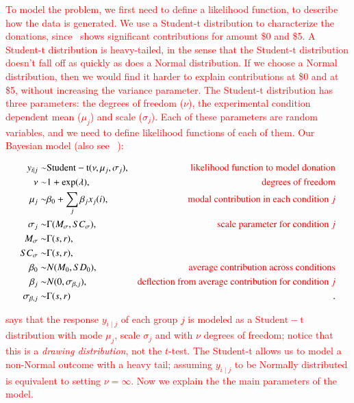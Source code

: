 \textcolor{red}{To model the problem, we first need to define a likelihood function, to describe how the data is generated. We use a Student-t distribution to characterize the donations, since~ shows significant contributions for amount \$0 and \$5. A Student-t distribution is heavy-tailed, in the sense that the Student-t distribution doesn't fall off as quickly as does a Normal distribution. If we choose a Normal distribution, then we would find it harder to explain contributions at \$0 and at \$5, without increasing the variance parameter. The Student-t distribution has three parameters: the degrees of freedom ($\nu$), the experimental condition dependent mean ($\mu_j$) and scale ($\sigma_j$). Each of these parameters are random variables, and we need to define likelihood functions of each of them. Our Bayesian model (also see~ ):}


\begin{align}
    y_{i \mid j} \sim &  \mathrm{Student-t}(\nu, \mu_j, \sigma_j),  & \textcolor{red}{\text{likelihood function to model donation}}\label{eq:bayesian formulation}\\
    \nu \sim & 1 + \exp(\lambda), & \textcolor{red}{\text{degrees of freedom}}\\
    \mu_j \sim & \beta_0 + \sum_j \beta_j x_j(i), & \textcolor{red}{\text{modal contribution in each condition } j}\label{eq:mean response}\\
    \sigma_j \sim & \Gamma(M_{\sigma}, SC_{\sigma}), & \textcolor{red}{\text{scale parameter for condition } j}\\
    M_{\sigma} \sim & \Gamma(s,r), & \\
    SC_{\sigma} \sim & \Gamma(s,r), &  \\
    \beta_0 \sim & N(M_0, SD_0), & \textcolor{red}{\text{average contribution across conditions}}\\
    \beta_j \sim & N (0, \sigma_{\beta, j}), & \textcolor{red}{\text{deflection from average contribution for condition } j}\\
    \sigma_{\beta, j} \sim & \Gamma(s,r) & .
\end{align}
 
\textcolor{red}{ says that the response $y_{i \mid j}$ of each group $j$ is modeled as a $\mathrm{Student-t}$ distribution with mode $\mu_j$,  scale $\sigma_j$ and with $\nu$ degrees of freedom; notice that this is a \textit{drawing distribution}, not the $t$-test. The Student-t allows us to model a non-Normal outcome with a heavy tail; assuming $y_{i \mid j}$ to be Normally distributed is equivalent to setting $\nu=\infty$. Now we explain the the main parameters of the model.}


